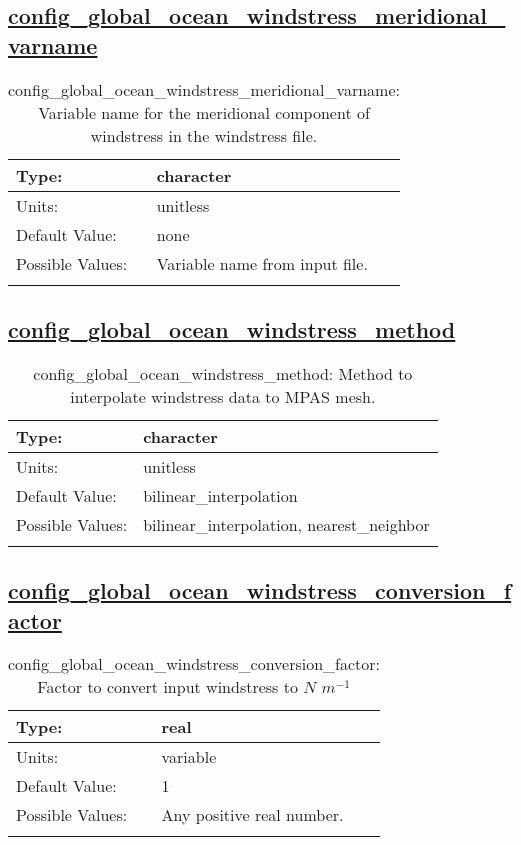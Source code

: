\subsection[config\_global\_ocean\_windstress\_meridional\_varname]{\hyperref[sec:nm_tab_global_ocean]{config\_global\_ocean\_windstress\_meridional\_varname}}
\label{subsec:nm_sec_config_global_ocean_windstress_meridional_varname}
\begin{center}
\begin{longtable}{| p{2.0in} || p{4.0in} |}
    \hline
    Type: & character \\
    \hline
    Units: & \si{unitless} \\
    \hline
    Default Value: & none \\
    \hline
    Possible Values: & Variable name from input file. \\
    \hline
    \caption{config\_global\_ocean\_windstress\_meridional\_varname: Variable name for the meridional component of windstress in the windstress file.}
\end{longtable}
\end{center}
\subsection[config\_global\_ocean\_windstress\_method]{\hyperref[sec:nm_tab_global_ocean]{config\_global\_ocean\_windstress\_method}}
\label{subsec:nm_sec_config_global_ocean_windstress_method}
\begin{center}
\begin{longtable}{| p{2.0in} || p{4.0in} |}
    \hline
    Type: & character \\
    \hline
    Units: & \si{unitless} \\
    \hline
    Default Value: & bilinear\_interpolation \\
    \hline
    Possible Values: & bilinear\_interpolation, nearest\_neighbor \\
    \hline
    \caption{config\_global\_ocean\_windstress\_method: Method to interpolate windstress data to MPAS mesh.}
\end{longtable}
\end{center}
\subsection[config\_global\_ocean\_windstress\_conversion\_factor]{\hyperref[sec:nm_tab_global_ocean]{config\_global\_ocean\_windstress\_conversion\_factor}}
\label{subsec:nm_sec_config_global_ocean_windstress_conversion_factor}
\begin{center}
\begin{longtable}{| p{2.0in} || p{4.0in} |}
    \hline
    Type: & real \\
    \hline
    Units: & \si{variable} \\
    \hline
    Default Value: & 1 \\
    \hline
    Possible Values: & Any positive real number. \\
    \hline
    \caption{config\_global\_ocean\_windstress\_conversion\_factor: Factor to convert input windstress to $N$ $m^{-1}$}
\end{longtable}
\end{center}
